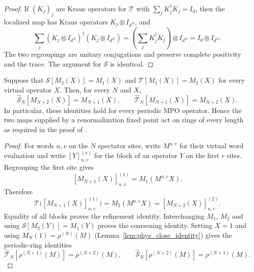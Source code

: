 \begin{proof}
    \leanok
    If $(K_j)_j$ are Kraus operators for $\mathcal T$ with
    $\sum_j K_j^\dagger K_j=I_d$, then the localized map has Kraus operators
    $K_j\otimes I_{d^N}$, and
    \[
      \sum_j (K_j\otimes I_{d^N})^\dagger(K_j\otimes I_{d^N})
        =\left(\sum_j K_j^\dagger K_j\right)\otimes I_{d^N}
        =I_d\otimes I_{d^N}.
    \]
    The two regroupings are unitary conjugations and preserve complete
    positivity and the trace.  The argument for $\mathcal S$ is identical.
\end{proof}

\begin{theorem}
    \label{thm:mpdo_global_renormalization_maps}
    \leanok
    Suppose that $\mathcal S[M_2(X)]=M_1(X)$ and
    $\mathcal T[M_1(X)]=M_2(X)$ for every virtual operator $X$.  Then, for
    every $N$ and $X$,
    \[
      \widehat{\mathcal S}_N[M_{N+2}(X)]=M_{N+1}(X),
      \qquad
      \widehat{\mathcal T}_N[M_{N+1}(X)]=M_{N+2}(X).
    \]
    In particular, these identities hold for every periodic MPO operator.
    Hence the two maps supplied by a renormalization fixed point act on rings
    of every length as required in the proof of
    \cite[Appendix~C, lines~1333--1341]{Cirac2016MPDO_arXiv}.
\end{theorem}

\begin{proof}
    \leanok
    For words $u,v$ on the $N$ spectator sites, write $M^{u,v}$ for their
    virtual word evaluation and write $[Y]^{(r)}_{u,v}$ for the block of an
    operator $Y$ on the first $r$ sites.  Regrouping the first site gives
    \[
      [M_{N+1}(X)]^{(1)}_{u,v}=M_1(M^{u,v}X).
    \]
    Therefore
    \[
      \mathcal T\bigl([M_{N+1}(X)]^{(1)}_{u,v}\bigr)
        =M_2(M^{u,v}X)
        =[M_{N+2}(X)]^{(2)}_{u,v}.
    \]
    Equality of all blocks proves the refinement identity.  Interchanging
    $M_1$, $M_2$ and using $\mathcal S[M_2(Y)]=M_1(Y)$ proves the coarsening
    identity.  Setting $X=1$ and using
    $M_N(1)=\rho^{(N)}(M)$
    (Lemma~\ref{lem:phys_close_identity}) gives the periodic-ring identities
    \[
      \widehat{\mathcal T}_N[\rho^{(N+1)}(M)]
        =\rho^{(N+2)}(M),\qquad
      \widehat{\mathcal S}_N[\rho^{(N+2)}(M)]
        =\rho^{(N+1)}(M).
    \]
\end{proof}

